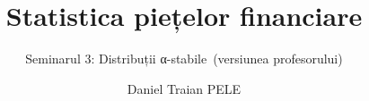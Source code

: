 \title[Statistica piețelor financiare]{Statistica piețelor financiare}
\subtitle{Seminarul 3: Distribuții α-stabile\ifsolutions\ (versiunea profesorului)\fi}
\author[D.T. Pele]{Daniel Traian PELE}
\date{}

\providecommand{\sfmapplink}[3]{\hypertarget{#2}{}\hyperlink{#1}{\beamergotobutton{#3}}}  %
\providecommand{\sfmappback}[2]{\begin{tikzpicture}[remember picture,overlay]\node[anchor=south east] at ([xshift=-3mm,yshift=7mm]current page.south east){\hyperlink{#1}{\beamerreturnbutton{#2}}};\end{tikzpicture}}  %
\providecommand{\sfmchlink}[2]{\href{#1}{#2}}  %
\providecommand{\sfmchlinkt}[2]{\href{#1}{\usebeamercolor[fg]{frametitle}#2}}  %


